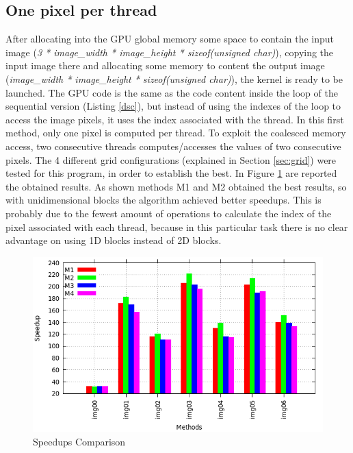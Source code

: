 \documentclass[a4paper]{article}
\begin{document}
\subsection{{One pixel per thread}}
\label{sec:dfm}
After allocating into the GPU global memory some space to contain the input image (\textit{3 * image\_width * image\_height * sizeof(unsigned char)}), copying the input image there and allocating some memory to content the output image (\textit{image\_width * image\_height * sizeof(unsigned char)}), the kernel is ready to be launched. The GPU code is the same as the code content inside the loop of the sequential version (Listing \ref{dsc}), but instead of using the indexes of the loop to access the image pixels, it uses the index associated with the thread. In this first method, only one pixel is computed per thread. To exploit the coalesced memory access, two consecutive threads computes/accesses the values of two consecutive pixels. The 4 different grid configurations (explained in Section \ref{sec:grid}) were tested for this program, in order to establish the best. In Figure \ref{fig:histo_darker} are reported the obtained results. As shown methods M1 and M2 obtained the best results, so with unidimensional blocks the algorithm achieved better speedups. This is probably due to the fewest amount of operations to calculate the index of the pixel associated with each thread, because in this particular task there is no clear advantage on using 1D blocks instead of 2D blocks.
\begin{figure}[!ht]
    \centering
    \includegraphics[width=0.9\linewidth]{res/new/darker_confronto}
    \caption{Speedups Comparison}
    \label{fig:histo_darker}
\end{figure}
\FloatBarrier
\end{document}
